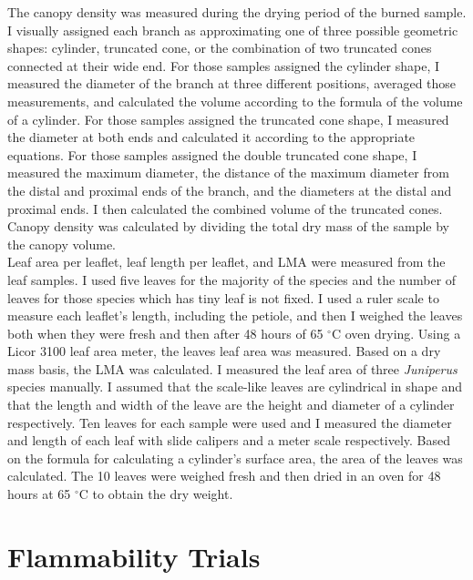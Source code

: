 \documentclass[12pt]{report}
\begin{document}
The canopy density was measured during the drying period of the burned sample. I visually assigned each branch as approximating one of three possible geometric shapes: cylinder, truncated cone, or the combination of two truncated cones connected at their wide end. For those samples assigned the cylinder shape, I measured the diameter of the branch at three different positions, averaged those measurements, and calculated the volume according to the formula of the volume of a cylinder. For those samples assigned the truncated cone shape, I measured the diameter at both ends and calculated it according to the appropriate equations. For those samples assigned the double truncated cone shape, I measured the maximum diameter, the distance of the maximum diameter from the distal and proximal ends of the branch, and the diameters at the distal and proximal ends. I then calculated the combined volume of the truncated cones. Canopy density was calculated by dividing the total dry mass of the sample by the canopy volume.\\

Leaf area per leaflet, leaf length per leaflet, and LMA were measured from the leaf samples. I used five leaves for the majority of the species and the number of leaves for those species which has tiny leaf is not fixed. I used a ruler scale to measure each leaflet's length, including the petiole, and then I weighed the leaves both when they were fresh and then after 48 hours of 65 $^{\circ}$C oven drying. Using a Licor 3100 leaf area meter, the leaves leaf area was measured. Based on a dry mass basis, the LMA was calculated. I measured the leaf area of three \emph{Juniperus} species manually. I assumed that the scale-like leaves are cylindrical in shape and that the length and width of the leave are the height and diameter of a cylinder respectively. Ten leaves for each sample were used and I measured the diameter and length of each leaf with slide calipers and a meter scale respectively. Based on the formula for calculating a cylinder's surface area, the area of the leaves was calculated. The 10 leaves were weighed fresh and then dried in an oven for 48 hours at 65 $^{\circ}$C to obtain the dry weight.

\section{Flammability Trials}
\end{document}

